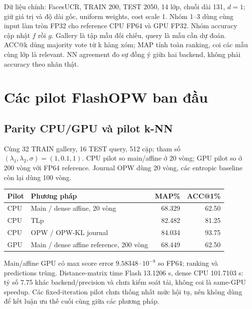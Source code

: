 \documentclass[11pt,a4paper]{article}
\begin{document}
Dữ liệu chính: FacesUCR, TRAIN 200, TEST 2050, 14 lớp,
chuỗi dài 131, $d=1$; giữ giá trị và độ dài gốc, uniform weights,
cost scale 1. Nhóm 1--3 dùng cùng input làm tròn FP32 cho reference CPU
FP64 và GPU FP32. Nhóm accuracy cập nhật $f$ rồi $g$.
Gallery là tập mẫu đối chiếu, query là mẫu cần dự đoán.
ACC@k dùng majority vote từ k hàng xóm; MAP tính toàn ranking,
coi các mẫu cùng lớp là relevant. NN agreement đo sự đồng ý giữa hai backend,
không phải accuracy theo nhãn thật.

\section{Các pilot FlashOPW ban đầu}
\subsection{Parity CPU/GPU và pilot k-NN}
Cùng 32 TRAIN gallery, 16 TEST query, 512 cặp; tham số
$(\lambda_1,\lambda_2,\sigma)=(1,0.1,1)$.
CPU pilot so main/affine ở 20 vòng; GPU pilot so ở 200 vòng với FP64 reference.
Journal OPW dùng 20 vòng, các entropic baseline còn lại dùng 100 vòng.
\begin{center}\small
\begin{tabular}{@{}llrr@{}}
\toprule
Pilot & Phương pháp & MAP\% & ACC@1\% \\
\midrule
CPU & Main / dense affine, 20 vòng & 68.329 & 62.50 \\
CPU & TLp & 82.482 & 81.25 \\
CPU & OPW / OPW-KL journal & 84.034 & 93.75 \\
GPU & Main / dense affine reference, 200 vòng & 68.449 & 62.50 \\
\bottomrule
\end{tabular}
\end{center}
Main/affine GPU có max score error $9.58348\cdot10^{-8}$ so FP64;
ranking và predictions trùng. Distance-matrix time Flash 13.1206 s,
dense CPU 101.7103 s: tỷ số 7.75 khác backend/precision và chưa kiểm soát tải,
không coi là same-GPU speedup. Các fixed-iteration pilot chưa thống nhất
mức hội tụ, nên không dùng để kết luận ưu thế cuối cùng giữa các phương pháp.
\end{document}

